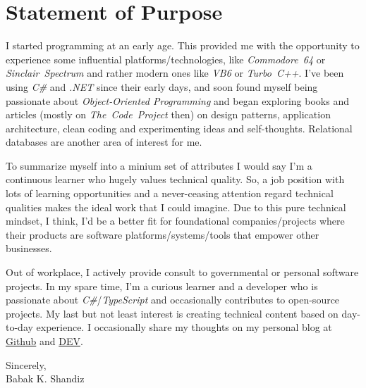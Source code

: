\documentclass[9pt,a4paper]{extarticle}
\begin{document}


\section*{Statement of Purpose}

I started programming at an early age. This provided me with the opportunity
to experience some influential platforms/technologies, like
\textit{Commodore~64} or \textit{Sinclair~Spectrum} and rather modern ones
like \textit{VB6} or \textit{Turbo~C++}. I've been using \textit{C\#} and
\textit{.NET} since their early days, and soon found myself being passionate
about \textit{Object-Oriented Programming} and began exploring books and
articles (mostly on \textit{The~Code~Project} then) on design patterns,
application architecture, clean coding and experimenting ideas and
self-thoughts. Relational databases are another area of interest for me.

To summarize myself into a minium set of attributes I would say I'm a
continuous learner who hugely values technical quality. So, a job position with
lots of learning opportunities and a never-ceasing attention regard technical
qualities makes the ideal work that I could imagine. Due to this pure technical
mindset, I think, I'd be a better fit for foundational companies/projects where
their products are software platforms/systems/tools that empower other
businesses.

Out of workplace, I actively provide consult to governmental or personal
software projects. In my spare time, I'm a curious learner and a developer who
is passionate about \textit{C\#}/\textit{TypeScript} and occasionally
contributes to open-source projects. My last but not least interest is
creating technical content based on day-to-day experience. I occasionally
share my thoughts on my personal blog at
\href{https://babakks.github.io}{Github} and
\href{https://dev.to/babakks}{DEV}.

\vspace{2em}
\noindent
Sincerely, \\
\noindent
Babak K. Shandiz
\end{document}
